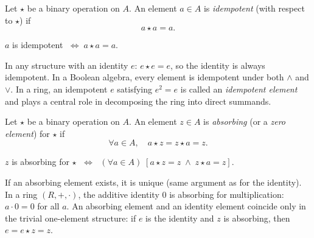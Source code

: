 \begin{tcolorbox}[colback=propbox, colframe=propborder, arc=2pt,
  left=6pt, right=6pt, top=4pt, bottom=4pt,
  title={\small\textbf{Definition (Idempotent Element)}},
  fonttitle=\small\bfseries]
\label{def:idempotent-element}
Let $\star$ be a binary operation on $A$.
An element $a \in A$ is \emph{idempotent} (with respect to $\star$) if
\[
  a \star a = a.
\]
\end{tcolorbox}

\begin{remark}
$a$ is idempotent $\;\iff\; a \star a = a$.
\end{remark}

\begin{remark}[Examples]
In any structure with an identity $e$: $e \star e = e$, so the identity
is always idempotent.
In a Boolean algebra, every element is idempotent under both $\land$ and $\lor$.
In a ring, an idempotent $e$ satisfying $e^2 = e$ is called an
\emph{idempotent element} and plays a central role in decomposing the ring
into direct summands.
\end{remark}

\begin{tcolorbox}[colback=propbox, colframe=propborder, arc=2pt,
  left=6pt, right=6pt, top=4pt, bottom=4pt,
  title={\small\textbf{Definition (Absorbing Element)}},
  fonttitle=\small\bfseries]
\label{def:absorbing-element}
Let $\star$ be a binary operation on $A$.
An element $z \in A$ is \emph{absorbing} (or a \emph{zero element})
for $\star$ if
\[
  \forall a \in A,\quad a \star z = z \star a = z.
\]
\end{tcolorbox}

\begin{remark}
$z$ is absorbing for $\star$
$\;\iff\;$
$(\forall a \in A)\;[a \star z = z \;\land\; z \star a = z]$.
\end{remark}

\begin{remark}
If an absorbing element exists, it is unique (same argument as for the
identity).
In a ring $(R, +, \cdot)$, the additive identity $0$ is absorbing for
multiplication: $a \cdot 0 = 0$ for all $a$.
An absorbing element and an identity element coincide only in the trivial
one-element structure: if $e$ is the identity and $z$ is absorbing,
then $e = e \star z = z$.
\end{remark}


